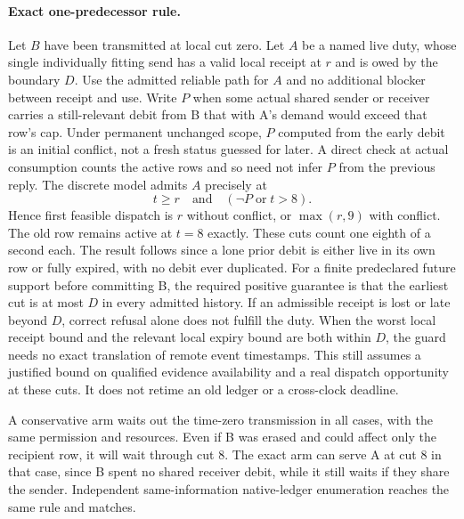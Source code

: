 \documentclass{article}
\begin{document}
\paragraph{Exact one-predecessor rule.}
Let \(B\) have been transmitted at local cut zero. Let \(A\) be a
named live duty, whose single individually fitting send has a valid
local receipt at \(r\) and is owed by the boundary \(D\).
Use the admitted reliable path for \(A\) and no additional blocker
between receipt and use. Write \(P\) when some actual shared sender
or receiver carries a still-relevant debit from B that with A's
demand would exceed that row's cap. Under permanent unchanged scope,
\(P\) computed from the early debit is an initial conflict, not a
fresh status guessed for later. A direct check at actual consumption
counts the active rows and so need not infer \(P\) from the previous
reply. The discrete model admits \(A\) precisely at
\[
 t\ge r \quad\text{and}\quad (\neg P\;\text{or}\;t>8).
\]
Hence first feasible dispatch is \(r\) without conflict, or
\(\max(r,9)\) with conflict. The old row remains active at \(t=8\)
exactly. These cuts count one eighth of a second each.
The result follows since a lone prior debit is either live in
its own row or fully expired, with no debit ever duplicated.
For a finite predeclared future support before committing B,
the required positive guarantee is that the earliest cut
is at most \(D\) in every admitted history. If an admissible
receipt is lost or late beyond \(D\), correct refusal alone
does not fulfill the duty. When the worst local receipt bound and
the relevant local expiry bound are both within \(D\), the
guard needs no exact translation of remote event timestamps.
This still assumes a justified bound on qualified evidence
availability and a real dispatch opportunity at these cuts.
It does not retime an old ledger or a cross-clock deadline.

A conservative arm waits out the time-zero transmission in
all cases, with the same permission and resources. Even if B
was erased and could affect only the recipient row, it will
wait through cut 8. The exact arm can serve A at cut 8 in that
case, since B spent no shared receiver debit, while it still
waits if they share the sender. Independent same-information
native-ledger enumeration reaches the same rule and matches.
\end{document}
